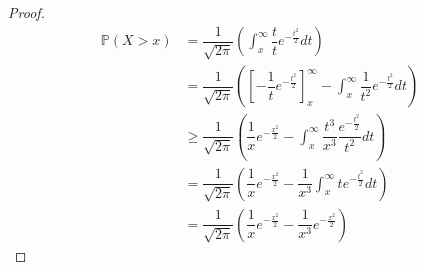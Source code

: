 \documentclass{article}
\theoremstyle{definition}
\numberwithin{equation}{section}
\begin{document}
\begin{proof}
\begin{align*}
    \mathbb{P}(X>x) &= \dfrac{1}{\sqrt{2\pi}}\left(\int_x^\infty \dfrac{t}{t}e^{-\frac{t^2}{2}}dt\right)\\
    &= \dfrac{1}{\sqrt{2\pi}}\left(\left[ -\dfrac{1}{t}e^{-\frac{t^2}{2}} \right]^\infty_x - \int_x^\infty \dfrac{1}{t^2}e^{-\frac{t^2}{2}}dt\right)\\
    &\geq \dfrac{1}{\sqrt{2\pi}}\left( \dfrac{1}{x}e^{-\frac{x^2}{2}} - \int_x^\infty \dfrac{t^3}{x^3}\dfrac{e^{-\frac{t^2}{2}}}{t^2}dt\right)\\
    &= \dfrac{1}{\sqrt{2\pi}}\left(\dfrac{1}{x}e^{-\frac{x^2}{2}} - \dfrac{1}{x^3}\int_x^\infty te^{-\frac{t^2}{2}}dt\right)\\
    &=\dfrac{1}{\sqrt{2\pi}}\left(\dfrac{1}{x}e^{-\frac{x^2}{2}} - \dfrac{1}{x^3}e^{-\frac{x^2}{2}}\right)
\end{align*}
\end{proof}
\end{document}
